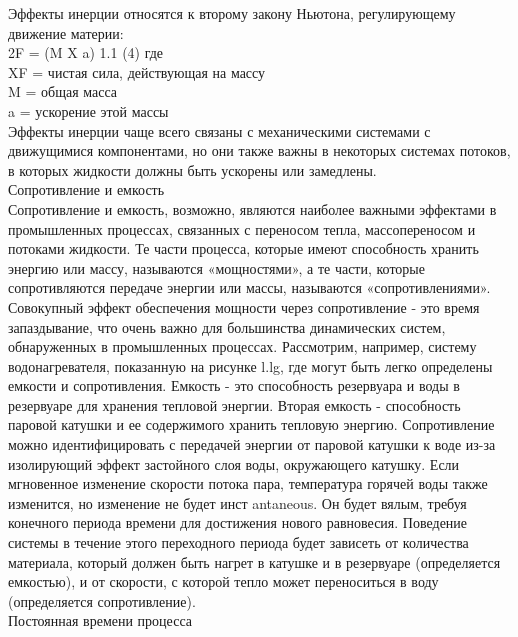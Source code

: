 \documentclass[aps,
12pt,
final,
oneside,
onecolumn,
musixtex, 
superscriptaddress,
centertags]{article}
\begin{document}
Эффекты инерции относятся к второму закону Ньютона, регулирующему движение материи: \\
2F = (M X a) 1.1 (4) где \\
XF = чистая сила, действующая на массу \\
M = общая масса \\
a = ускорение этой массы \\
Эффекты инерции чаще всего связаны с механическими системами с движущимися компонентами, но они также важны в некоторых системах потоков, в которых жидкости должны быть ускорены или замедлены.\\

Сопротивление и емкость\\

Сопротивление и емкость, возможно, являются наиболее важными эффектами в промышленных процессах, связанных с переносом тепла, массопереносом и потоками жидкости. Те части процесса, которые имеют способность хранить энергию или массу, называются «мощностями», а те части, которые сопротивляются передаче энергии или массы, называются «сопротивлениями». Совокупный эффект обеспечения мощности через сопротивление - это время запаздывание, что очень важно для большинства динамических систем, обнаруженных в промышленных процессах. Рассмотрим, например, систему водонагревателя, показанную на рисунке l.lg, где могут быть легко определены емкости и сопротивления. Емкость - это способность резервуара и воды в резервуаре для хранения тепловой энергии. Вторая емкость - способность паровой катушки и ее содержимого хранить тепловую энергию. Сопротивление можно идентифицировать с передачей энергии от паровой катушки к воде из-за изолирующий эффект застойного слоя воды, окружающего катушку. Если мгновенное изменение скорости потока пара, температура горячей воды также изменится, но изменение не будет инст antaneous. Он будет вялым, требуя конечного периода времени для достижения нового равновесия. Поведение системы в течение этого переходного периода будет зависеть от количества материала, который должен быть нагрет в катушке и в резервуаре (определяется емкостью), и от скорости, с которой тепло может переноситься в воду (определяется сопротивление).\\

Постоянная времени процесса \\
\end{document}
